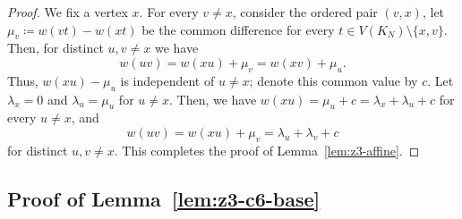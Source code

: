 \documentclass[11pt]{article}
\theoremstyle{remark}
\begin{document}
\begin{proof}
    We fix a vertex $x$.
    For every $v\ne x$, consider the ordered pair $(v,x)$, let $\mu_v\coloneqq w(vt)-w(xt)$ be the common difference for every $t\in V(K_N)\setminus\{x,v\}$.
    Then, for distinct $u,v\ne x$ we have
    \[
        w(uv)=w(xu)+\mu_v=w(xv)+\mu_u.
    \]
    Thus, $w(xu)-\mu_u$ is independent of $u\ne x$; denote this common value by $c$.
    Let $\lambda_x=0$ and $\lambda_u=\mu_u$ for $u\ne x$.
    Then, we have $w(xu)=\mu_u+c=\lambda_x+\lambda_u+c$  for every $u\ne x$, and
    \[
        w(uv)=w(xu)+\mu_v=\lambda_u+\lambda_v+c
    \]
    for distinct $u,v\ne x$.
    This completes the proof of Lemma~\ref{lem:z3-affine}.
\end{proof}


\subsection{Proof of Lemma~\ref{lem:z3-c6-base}}
\end{document}
